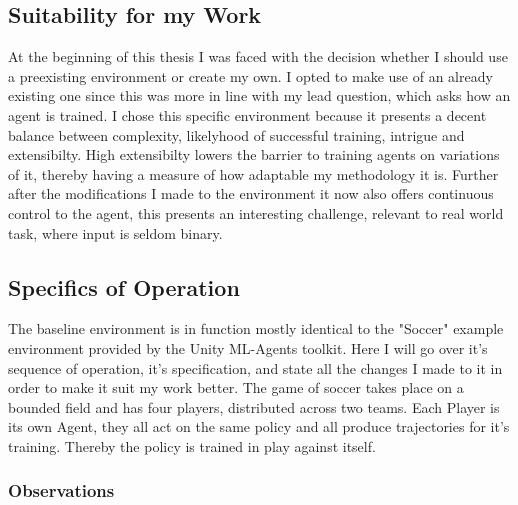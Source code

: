 \subsection{Suitability for my Work}\label{subsec:ip:environment:suitabilty}
At the beginning of this thesis I was faced with the decision whether I should use a preexisting environment or create my own. I opted to make use of an already existing one since this was more in line with my lead question, which asks how an agent is trained. I chose this specific environment because it presents a decent balance between complexity, likelyhood of successful training, intrigue and extensibilty. High extensibilty lowers the barrier to training agents on variations of it, thereby having a measure of how adaptable my methodology it is. Further after the modifications I made to the environment it now also offers continuous control to the agent, this presents an interesting challenge, relevant to real world task, where input is seldom binary.

\subsection{Specifics of Operation}\label{subsec:ip:environment:implementation}
The baseline environment is in function mostly identical to the "Soccer" example environment provided by the Unity ML-Agents toolkit. Here I will go over it's sequence of operation, it's specification, and state all the changes I made to it in order to make it suit my work better. The game of soccer takes place on a bounded field and has four players, distributed across two teams. Each Player is its own Agent, they all act on the same policy and all produce trajectories for it's training. Thereby the policy is trained in play against itself. 

\newpage

\subsubsection{Observations}\label{subsubsec:ip:environment:impl:observations}

